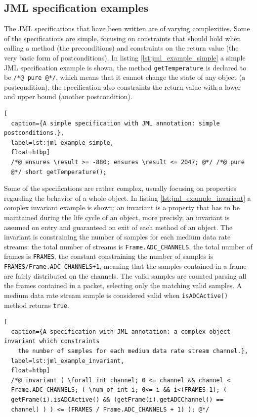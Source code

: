\documentclass{article} \usepackage{times}
\newcommand{\lil}[1]{\texttt{\lstinline|#1|}}
\begin{document}
\subsection{JML specification examples}
\label{subsec:a_jml_specification_example}

The JML specifications that have been written are of varying
complexities.  Some of the specifications are simple, focusing on
constraints that should hold when calling a method (the preconditions)
and constraints on the return value (the very basic form of
postconditions).  In listing \ref{lst:jml_example_simple} a simple JML
specification example is shown, the method \lil{getTemperature} is
declared to be \lil{/*@ pure @*/}, which means that it cannot change
the state of any object (a postcondition), the specification also
constraints the return value with a lower and upper bound (another
postcondition).

\begin{lstlisting}[
  caption={A simple specification with JML annotation: simple postconditions.},
  label=lst:jml_example_simple,
  float=htbp]
  /*@ ensures \result >= -880; ensures \result <= 2047; @*/ /*@ pure
  @*/ short getTemperature();
\end{lstlisting}

\sloppy

Some of the specifications are rather complex, usually focusing on
properties regarding the behavior of a whole object.  In listing
\ref{lst:jml_example_invariant} a complex invariant example is shown;
an invariant is a property that has to be maintained during the life
cycle of an object, more precisly, an invariant is assumed on entry
and guaranteed on exit of each method of an object.  The invariant is
constraining the number of samples for each medium data rate streams:
the total number of streams is \lil{Frame.ADC_CHANNELS}, the total
number of frames is \lil{FRAMES}, the constant constraining the number
of samples is \lil{FRAMES/Frame.ADC_CHANNELS+1}, meaning that the
samples contained in a frame are fairly distributed on the channels.
The valid samples are counted parsing all the frames contained in a
packet, selecting only the matching valid samples.  A medium data rate
stream sample is considered valid when \lil{isADCActive()} method
returns \lil{true}.

\fussy

\begin{lstlisting}[
  caption={A specification with JML annotation: a complex object invariant which constraints 
    the number of samples for each medium data rate stream channel.},
  label=lst:jml_example_invariant,
  float=htbp]
  /*@ invariant ( \forall int channel; 0 <= channel && channel <
  Frame.ADC_CHANNELS; ( \num_of int i; 0<= i && i<(FRAMES-1); (
  getFrame(i).isADCActive() && (getFrame(i).getADCChannel() ==
  channel) ) ) <= (FRAMES / Frame.ADC_CHANNELS + 1) ); @*/
\end{lstlisting}
\end{document}
